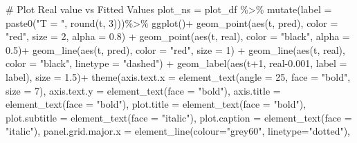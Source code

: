\documentclass[
  a4paper,
  DIV=11,
  numbers=noendperiod]{scrreprt}
\newenvironment{Shaded}{\begin{snugshade}}{\end{snugshade}}
\newcommand{\AttributeTok}[1]{\textcolor[rgb]{0.40,0.45,0.13}{#1}}
\newcommand{\CommentTok}[1]{\textcolor[rgb]{0.37,0.37,0.37}{#1}}
\newcommand{\DecValTok}[1]{\textcolor[rgb]{0.68,0.00,0.00}{#1}}
\newcommand{\FloatTok}[1]{\textcolor[rgb]{0.68,0.00,0.00}{#1}}
\newcommand{\FunctionTok}[1]{\textcolor[rgb]{0.28,0.35,0.67}{#1}}
\newcommand{\NormalTok}[1]{\textcolor[rgb]{0.00,0.23,0.31}{#1}}
\newcommand{\OtherTok}[1]{\textcolor[rgb]{0.00,0.23,0.31}{#1}}
\newcommand{\SpecialCharTok}[1]{\textcolor[rgb]{0.37,0.37,0.37}{#1}}
\newcommand{\StringTok}[1]{\textcolor[rgb]{0.13,0.47,0.30}{#1}}
\begin{document}
\begin{Shaded}
\begin{Highlighting}[]
  \CommentTok{\# Plot Real value vs Fitted Values }
\NormalTok{  plot\_ns }\OtherTok{=}\NormalTok{ plot\_df }\SpecialCharTok{\%\textgreater{}\%}
    \FunctionTok{mutate}\NormalTok{(}\AttributeTok{label =} \FunctionTok{paste0}\NormalTok{(}\StringTok{"T = "}\NormalTok{, }\FunctionTok{round}\NormalTok{(t, }\DecValTok{3}\NormalTok{)))}\SpecialCharTok{\%\textgreater{}\%}
    \FunctionTok{ggplot}\NormalTok{()}\SpecialCharTok{+}
    \FunctionTok{geom\_point}\NormalTok{(}\FunctionTok{aes}\NormalTok{(t, pred), }\AttributeTok{color =} \StringTok{"red"}\NormalTok{, }\AttributeTok{size =} \DecValTok{2}\NormalTok{, }\AttributeTok{alpha =} \FloatTok{0.8}\NormalTok{) }\SpecialCharTok{+}
    \FunctionTok{geom\_point}\NormalTok{(}\FunctionTok{aes}\NormalTok{(t, real), }\AttributeTok{color =} \StringTok{"black"}\NormalTok{, }\AttributeTok{alpha =} \FloatTok{0.5}\NormalTok{)}\SpecialCharTok{+}
    \FunctionTok{geom\_line}\NormalTok{(}\FunctionTok{aes}\NormalTok{(t, pred), }\AttributeTok{color =} \StringTok{"red"}\NormalTok{, }\AttributeTok{size =} \DecValTok{1}\NormalTok{) }\SpecialCharTok{+}
    \FunctionTok{geom\_line}\NormalTok{(}\FunctionTok{aes}\NormalTok{(t, real), }\AttributeTok{color =} \StringTok{"black"}\NormalTok{, }\AttributeTok{linetype =} \StringTok{"dashed"}\NormalTok{) }\SpecialCharTok{+}
    \FunctionTok{geom\_label}\NormalTok{(}\FunctionTok{aes}\NormalTok{(t}\SpecialCharTok{+}\DecValTok{1}\NormalTok{, real}\FloatTok{{-}0.001}\NormalTok{, }\AttributeTok{label =}\NormalTok{ label), }\AttributeTok{size =} \FloatTok{1.5}\NormalTok{)}\SpecialCharTok{+}
    \FunctionTok{theme}\NormalTok{(}\AttributeTok{axis.text.x =} \FunctionTok{element\_text}\NormalTok{(}\AttributeTok{angle =} \DecValTok{25}\NormalTok{, }\AttributeTok{face =} \StringTok{"bold"}\NormalTok{, }\AttributeTok{size =} \DecValTok{7}\NormalTok{), }
          \AttributeTok{axis.text.y =} \FunctionTok{element\_text}\NormalTok{(}\AttributeTok{face =} \StringTok{"bold"}\NormalTok{), }
          \AttributeTok{axis.title  =} \FunctionTok{element\_text}\NormalTok{(}\AttributeTok{face =} \StringTok{"bold"}\NormalTok{),}
          \AttributeTok{plot.title  =} \FunctionTok{element\_text}\NormalTok{(}\AttributeTok{face =} \StringTok{"bold"}\NormalTok{),}
          \AttributeTok{plot.subtitle =} \FunctionTok{element\_text}\NormalTok{(}\AttributeTok{face =} \StringTok{"italic"}\NormalTok{),}
          \AttributeTok{plot.caption =} \FunctionTok{element\_text}\NormalTok{(}\AttributeTok{face =} \StringTok{"italic"}\NormalTok{),}
          \AttributeTok{panel.grid.major.x =} \FunctionTok{element\_line}\NormalTok{(}\AttributeTok{colour=}\StringTok{"grey60"}\NormalTok{, }\AttributeTok{linetype=}\StringTok{"dotted"}\NormalTok{),}

\end{Highlighting}
\end{Shaded}
\end{document}
